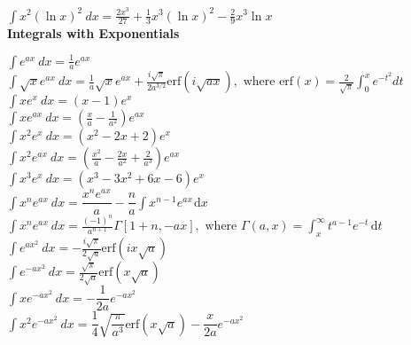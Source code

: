 \documentclass[10pt,landscape,a4paper]{article}
\begin{document}
\begin{multicols*}{3}
$
\int x^2 (\ln x)^2\ dx = \frac{2 x^3}{27}+\frac{1}{3} x^3 (\ln x)^2-\frac{2}{9} x^3 \ln x
$\\
 
 
 \textbf{Integrals with Exponentials}

$
\int e^{ax}\ dx = \frac{1}{a}e^{ax} 
$\\

$\label{eq:ajoy}
\int \sqrt{x} e^{ax}\ dx = \frac{1}{a}\sqrt{x}e^{ax} 
+\frac{i\sqrt{\pi}}{2a^{3/2}}
\text{erf}\left(i\sqrt{ax}\right),
\text{ where erf}(x)=\frac{2}{\sqrt{\pi}}\int_0^x e^{-t^2}dt
$\\

$
\int x e^x\ dx = (x-1) e^x 
$\\

$
\int x e^{ax}\ dx = \left(\frac{x}{a}-\frac{1}{a^2}\right) e^{ax} 
$\\

$
\int x^2 e^{x}\ dx = \left(x^2 - 2x + 2\right) e^{x}
$\\

$
\int x^2 e^{ax}\ dx = \left(\frac{x^2}{a}-\frac{2x}{a^2}+\frac{2}{a^3}\right) e^{ax} 
$\\

$
\int x^3 e^{x}\ dx = \left(x^3-3x^2 + 6x - 6\right) e^{x} 
$\\
 
$\label{eq:swift1}
\int x^n e^{ax}\ dx = \dfrac{x^n e^{ax}}{a} - 
\dfrac{n}{a}\int x^{n-1}e^{ax}\hspace{1pt}\text{d}x
$\\ 
 
$\label{eq:ebke}
\int x^n e^{ax}\ dx = \frac{(-1)^n}{a^{n+1}}\Gamma[1+n,-ax], 
 \text{ where } \Gamma(a,x)=\int_x^{\infty} t^{a-1}e^{-t}\hspace{2pt}\text{d}t
 $\\

$\label{eq:swift2}
\int e^{ax^2}\ dx = -\frac{i\sqrt{\pi}}{2\sqrt{a}}\text{erf}\left(ix\sqrt{a}\right) 
$\\

$\label{eq:swift3}
\int e^{-ax^2}\ dx = \frac{\sqrt{\pi}}{2\sqrt{a}}\text{erf}\left(x\sqrt{a}\right) 
$\\

$\label{eq:qarles1}
\int x e^{-ax^2}\ {dx} = -\dfrac{1}{2a}e^{-ax^2} 
$\\

$\label{eq:qarles2}
\int x^2 e^{-ax^2}\ {dx} = \dfrac{1}{4}\sqrt{\dfrac{\pi}{a^3}}\text{erf}(x\sqrt{a}) -\dfrac{x}{2a}e^{-ax^2}
$\\



\end{multicols*}
\end{document}
